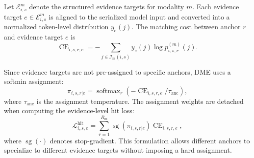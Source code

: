Let $\mathcal{E}_{i,s}^{m}$ denote the structured evidence targets for modality $m$. Each evidence target $e \in \mathcal{E}_{i,s}^{m}$ is aligned to the serialized model input and converted into a normalized token-level distribution $y_e(j)$. The matching cost between anchor $r$ and evidence target $e$ is
\begin{equation}
    \operatorname{CE}_{i,s,r,e}
    =
    -
    \sum_{j \in \mathcal{I}_m(i,s)}
    y_e(j)
    \log
    p_{i,s,r}^{(m)}(j).
\label{eq:app-anchor-ce}
\end{equation}

Since evidence targets are not pre-assigned to specific anchors, DME uses a softmin assignment:
\begin{equation}
    \pi_{i,s,r|e}
    =
    \operatorname{softmax}_{r}
    \left(
        -
        \operatorname{CE}_{i,s,r,e}
        /
        \tau_{\mathrm{anc}}
    \right),
\label{eq:app-softmin-assignment}
\end{equation}
where $\tau_{\mathrm{anc}}$ is the assignment temperature. The assignment weights are detached when computing the evidence-level hit loss:
\begin{equation}
    \mathcal{L}_{i,s,e}^{\mathrm{hit}}
    =
    \sum_{r=1}^{R_m}
    \operatorname{sg}
    \left(
        \pi_{i,s,r|e}
    \right)
    \operatorname{CE}_{i,s,r,e},
\label{eq:app-evidence-hit}
\end{equation}
where $\operatorname{sg}(\cdot)$ denotes stop-gradient. This formulation allows different anchors to specialize to different evidence targets without imposing a hard assignment.

